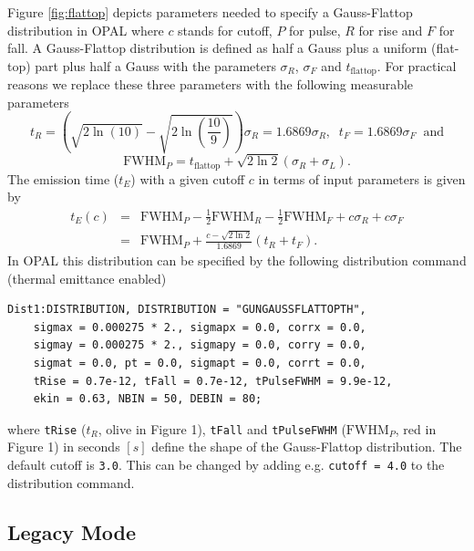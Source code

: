 Figure \ref{fig:flattop} depicts parameters needed to specify a Gauss-Flattop
distribution in \textsc{OPAL} where $c$ stands for cutoff, $P$ for pulse, $R$
for rise and $F$ for fall. A Gauss-Flattop distribution is defined as half a
Gauss plus a uniform (flat-top) part plus half a Gauss with the parameters
$\sigma_R$, $\sigma_F$ and $t_\mathrm{flattop}$. For practical reasons we
replace these three parameters with the following measurable parameters
\[ 
    t_R = \left(\sqrt{2\ln{\left(10\right)}}-\sqrt{2\ln{\left(\frac{10}{9}\right)}}\right)\sigma_R = 1.6869\sigma_R, \;\; t_F = 1.6869\sigma_F \;\; \mathrm{and}
\]
\[
    \mathrm{FWHM}_P = t_\mathrm{flattop} + \sqrt{2\ln{2}}(\sigma_R+\sigma_L)\mathrm{.}
\]
%    
The emission time ($t_E$) with a given cutoff $c$ in terms of input parameters
is given by
%
\begin{eqnarray*}
    t_E(c) &=& \mathrm{FWHM}_{P} - \frac{1}{2} \mathrm{FWHM}_R - \frac{1}{2}
    \mathrm{FWHM}_F + c\sigma_R + c\sigma_F \\
    &=& \mathrm{FWHM}_{P} + \frac{c - \sqrt{2\ln{2}}}{1.6869} (t_R + t_F) \mathrm{.}
\end{eqnarray*}
%
In \textsc{OPAL} this distribution can be specified by the following
distribution command (thermal emittance enabled)
%
\begin{verbatim}
Dist1:DISTRIBUTION, DISTRIBUTION = "GUNGAUSSFLATTOPTH",
    sigmax = 0.000275 * 2., sigmapx = 0.0, corrx = 0.0,
    sigmay = 0.000275 * 2., sigmapy = 0.0, corry = 0.0,
    sigmat = 0.0, pt = 0.0, sigmapt = 0.0, corrt = 0.0,
    tRise = 0.7e-12, tFall = 0.7e-12, tPulseFWHM = 9.9e-12,
    ekin = 0.63, NBIN = 50, DEBIN = 80;
\end{verbatim}
%
where \texttt{tRise} ($t_R$, olive in Figure 1), \texttt{tFall} and
\texttt{tPulseFWHM} ($\mathrm{FWHM}_P$, red in Figure 1) in seconds $[s]$ define
the shape of the Gauss-Flattop distribution. The default cutoff is \texttt{3.0}.
This can be changed by adding e.g. \texttt{cutoff = 4.0} to the distribution
command.

\subsection{Legacy Mode}

